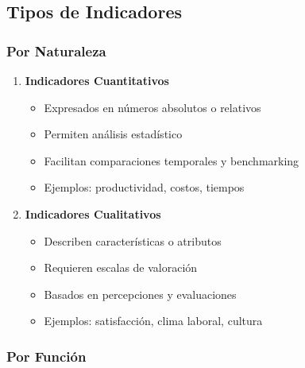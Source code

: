 \documentclass[12pt,letterpaper,oneside]{book}
\begin{document}
\subsection{Tipos de Indicadores}

\subsubsection{Por Naturaleza}

\begin{enumerate}
\item \textbf{Indicadores Cuantitativos}
   \begin{itemize}
   \item Expresados en números absolutos o relativos
   \item Permiten análisis estadístico
   \item Facilitan comparaciones temporales y benchmarking
   \item Ejemplos: productividad, costos, tiempos
   \end{itemize}

\item \textbf{Indicadores Cualitativos}
   \begin{itemize}
   \item Describen características o atributos
   \item Requieren escalas de valoración
   \item Basados en percepciones y evaluaciones
   \item Ejemplos: satisfacción, clima laboral, cultura
   \end{itemize}
\end{enumerate}

\subsubsection{Por Función}
\end{document}
